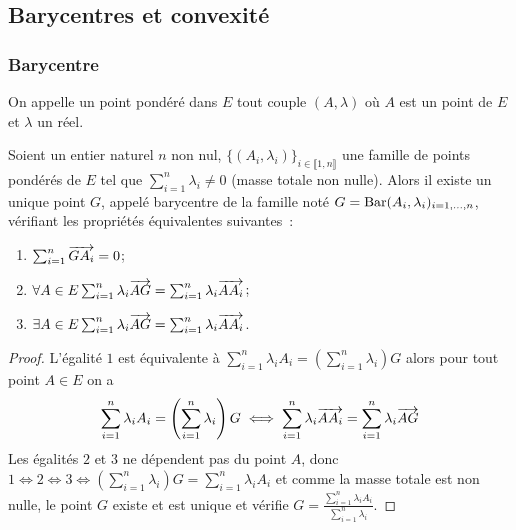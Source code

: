 \subsection{Barycentres et convexité}

\subsubsection{Barycentre}

\begin{defdef}
  On appelle un point pondéré dans \(E\) tout couple \((A,\lambda)\) où \(A\) 
  est un point de \(E\) et \(\lambda\) un réel.
\end{defdef}

\begin{theo}
  Soient un entier naturel \(n\) non nul, \(\{(A_i,\lambda_i)\}_{i \in 
  \llbracket 1,n \rrbracket}\) une famille de points pondérés de \(E\) tel que 
  \(\sum_{i=1}^n \lambda_i \neq 0\) (masse totale non nulle). Alors il existe un 
  unique point \(G\), appelé barycentre de la famille noté 
  \(G=\operatorname{Bar}(A_i,\lambda_i)_{i=1, \ldots, n}\), vérifiant les propriétés 
  équivalentes suivantes~:
  \begin{enumerate}
    \item \(\sum_{i=1}^n \overrightarrow{GA_i}=0\);
    \item \(\forall A \in E \sum_{i=1}^n \lambda_i \overrightarrow{AG}=\sum_{i=1}^n 
      \lambda_i \overrightarrow{AA_i}\);
    \item \(\exists A \in E \sum_{i=1}^n \lambda_i \overrightarrow{AG}=\sum_{i=1}^n 
      \lambda_i \overrightarrow{AA_i}\).
  \end{enumerate}
\end{theo}
\begin{proof}
  L'égalité \(1\) est équivalente à \(\sum_{i=1}^n \lambda_i A_i = 
  \left(\sum_{i=1}^n \lambda_i \right) G\) alors pour tout point \(A \in E\) on 
  a
  \begin{equation}
    \sum_{i=1}^n \lambda_i A_i = \left(\sum_{i=1}^n \lambda_i \right) G \iff 
    \sum_{i=1}^n \lambda_i \overrightarrow{AA_i} = \sum_{i=1}^n \lambda_i \overrightarrow{AG}
  \end{equation}
  Les égalités \(2\) et \(3\) ne dépendent pas du point \(A\), donc \(1 \iff 2 
  \iff 3 \iff \left(\sum_{i=1}^n \lambda_i \right) G = \sum_{i=1}^n \lambda_i 
  A_i\) et comme la masse totale est non nulle, le point \(G\) existe et est 
  unique et vérifie \(G = \frac{\sum_{i=1}^n \lambda_i A_i}{\sum_{i=1}^n 
  \lambda_i}\).
\end{proof}

